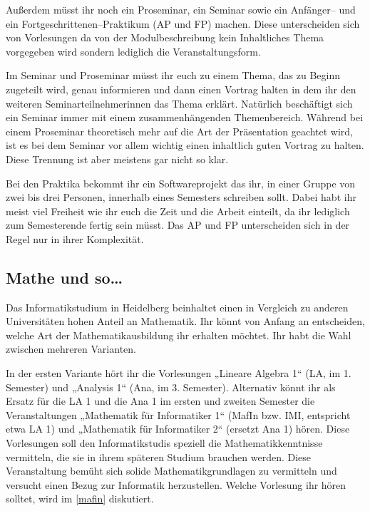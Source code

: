 Außerdem müsst ihr noch ein Proseminar, ein Seminar sowie ein An\-fän\-ger-- und ein Fortgeschrittenen--Praktikum (\gls{AP} und \gls{FP}) machen. Diese unterscheiden sich von Vorlesungen da von der Modulbeschreibung kein Inhaltliches Thema vorgegeben wird sondern lediglich die Veranstaltungsform.

Im Seminar und Proseminar müsst ihr euch zu einem Thema, das zu Beginn zugeteilt wird, genau informieren und dann einen Vortrag halten in dem ihr den weiteren Seminarteilnehmerinnen das Thema erklärt. Natürlich beschäftigt sich ein Seminar immer mit einem zusammenhängenden Themenbereich. Während bei einem Proseminar theoretisch mehr auf die Art der Präsentation geachtet wird, ist es bei dem Seminar vor allem wichtig einen inhaltlich guten Vortrag zu halten. Diese Trennung ist aber meistens gar nicht so klar.

Bei den Praktika bekommt ihr ein Softwareprojekt das ihr, in einer Gruppe von zwei bis drei Personen, innerhalb eines Semesters schreiben sollt. Dabei habt ihr meist viel Freiheit wie ihr euch die Zeit und die Arbeit einteilt, da ihr lediglich zum Semesterende fertig sein müsst. Das AP und FP unterscheiden sich in der Regel nur in ihrer Komplexität.

\subsection{Mathe und so\dots}

Das Informatikstudium in Heidelberg beinhaltet einen in Vergleich zu anderen Universitäten hohen Anteil an Mathematik. Ihr könnt von Anfang an entscheiden, welche Art der Mathematikausbildung ihr erhalten möchtet. Ihr habt die Wahl zwischen mehreren Varianten.

In der ersten Variante hört ihr die Vorlesungen „Lineare Algebra 1“ (\gls{LA}, im 1. Semester) und „Analysis 1“ (\gls{Ana}, im 3. Semester). Alternativ könnt ihr als Ersatz für die LA 1 und die Ana 1 im ersten und zweiten Semester die Veranstaltungen „Mathematik für Informatiker 1“ (\gls{MafIn} bzw. IMI, entspricht etwa LA 1) und „Mathematik für Informatiker 2“ (ersetzt Ana 1) hören. Diese Vorlesungen soll den Informatikstudis speziell die Mathematikkenntnisse vermitteln, die sie in ihrem späteren Studium brauchen werden. Diese Veranstaltung bemüht sich solide Mathematikgrundlagen zu vermitteln und versucht einen Bezug zur Informatik herzustellen. Welche Vorlesung ihr hören solltet, wird im \autoref{mafin} diskutiert.

